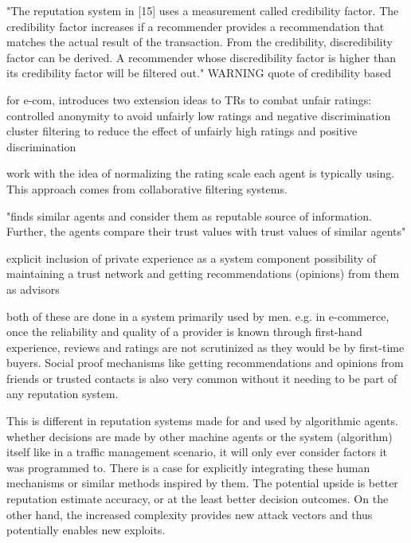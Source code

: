 \documentclass[%
    ]{\PathToTumTemplate/thesis/tum_thesis}
\begin{document}
"The reputation system in [15] uses a measurement called credibility factor. The credibility factor increases if a
recommender provides a recommendation that matches the actual result of the transaction. From the credibility,
discredibility factor can be derived. A recommender whose discredibility factor is higher than its credibility factor
will be filtered out."
WARNING quote of credibility based

\cite{dellarocas_immunizing_2000} for e-com, introduces two extension ideas to TRs to combat unfair ratings:
controlled anonymity to avoid unfairly low ratings and negative discrimination
cluster filtering to reduce the effect of unfairly high ratings and positive discrimination

\cite{margaris_improving_2017}\cite{margaris_improving_2018} work with the idea of normalizing the rating scale each agent is typically using. This approach comes from collaborative filtering systems.

\cite{zupancic_qade_2015}
"finds similar agents and consider them as reputable source of information. Further, the agents compare their trust values with trust values of similar agents"



explicit inclusion of private experience as a system component
possibility of maintaining a trust network and getting recommendations (opinions) from them as advisors

both of these are done in a system primarily used by men. e.g. in e-commerce, once the reliability and quality of a provider is known through first-hand experience, reviews and ratings are not scrutinized as they would be by first-time buyers. Social proof mechanisms like getting recommendations and opinions from friends or trusted contacts is also very common without it needing to be part of any reputation system. 

This is different in reputation systems made for and used by algorithmic agents. whether decisions are made by other machine agents or the system (algorithm) itself like in a traffic management scenario, it will only ever consider factors it was programmed to. There is a case for explicitly integrating these human mechanisms or similar methods inspired by them. The potential upside is better reputation estimate accuracy, or at the least better decision outcomes. On the other hand, the increased complexity provides new attack vectors and thus potentially enables new exploits.
\end{document}
